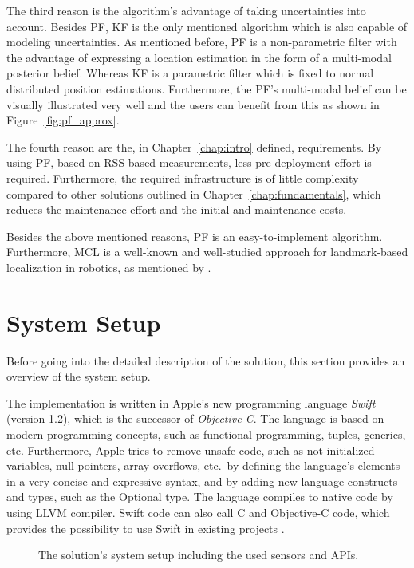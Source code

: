 The third reason is the algorithm's advantage of taking uncertainties into account. Besides \ac{PF}, \ac{KF} is the only mentioned algorithm which is also capable of modeling uncertainties. As mentioned before, \acs{PF} is a non-parametric filter with the advantage of expressing a location estimation in the form of a multi-modal posterior belief. Whereas \ac{KF} is a parametric filter which is fixed to normal distributed position estimations. Furthermore, the \ac{PF}'s multi-modal belief can be visually illustrated very well and the users can benefit from this as shown in Figure~\ref{fig:pf_approx}.

The fourth reason are the, in Chapter~\ref{chap:intro} defined, requirements. By using \acs{PF}, based on \acs{RSS}-based measurements, less pre-deployment effort is required. Furthermore, the required infrastructure is of little complexity compared to other solutions outlined in Chapter~\ref{chap:fundamentals}, which reduces the maintenance effort and the initial and maintenance costs.

Besides the above mentioned reasons, \acl{PF} is an easy-to-implement algorithm. Furthermore, \ac{MCL} is a well-known and well-studied approach for landmark-based localization in robotics, as mentioned by \citet{thrun:prob_robo}.


\section{System Setup}
Before going into the detailed description of the solution, this section provides an overview of the system setup.

The implementation is written in Apple's new programming language \emph{Swift} (version 1.2), which is the successor of \emph{Objective-C}. The language is based on modern programming concepts, such as functional programming, tuples, generics, etc. Furthermore, Apple tries to remove unsafe code, such as not initialized variables, null-pointers, array overflows, etc.\ by defining the language's elements in a very concise and expressive syntax, and by adding new language constructs and types, such as the Optional type. The language compiles to native code by using LLVM compiler. Swift code can also call C and Objective-C code, which provides the possibility to use Swift in existing projects \citep{apple:swift}.

\begin{figure}[height=0.45\textheight]
	
	\caption{The solution's system setup including the used sensors and \acsp{API}.}
	\label{fig:algo_architecture}
\end{figure}

